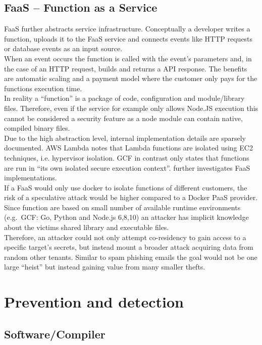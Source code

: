 \documentclass[conference,compsoc,final,a4paper]{IEEEtran}
\begin{document}
\subsection{\acs{FaaS} -- Function as a Service}
\acs{FaaS} further abstracts service infrastructure. Conceptually a developer writes a function, uploads it to the \acs{FaaS} service and connects events like HTTP requests or
database events as an input source. \\
When an event occurs the function is called with the event's parameters and, in the case of an HTTP request, builds and
returns a API response. The benefits are automatic scaling and a payment model where the customer only pays for the functions execution time. \cite{lambdaFeatures}\\
In reality a \enquote{function} is a package of code, configuration and module/library files. Therefore, even if the service for example only allows Node.JS execution
this cannot be considered a security feature as a node module can contain native, compiled binary files. \cite{lambdaFaq} \\
Due to the high abstraction level, internal implementation details are sparsely documented. \ac{AWS} Lambda notes that Lambda functions are isolated using EC2 techniques, i.e.
hypervisor isolation\cite{lambdaFaq}. \ac{GCF} in contrast only states that functions are run in
\enquote{its own isolated secure execution context}\cite{cloudFunc}. \textcite{wang2018peeking} further investigates \acs{FaaS} implementations. \\
If a \acs{FaaS} would only use docker to isolate functions of different customers, the risk of a speculative attack would be higher compared to a Docker \ac{PaaS} provider. Since function are based on small number of available runtime environments (e.g.\ \ac{GCF}: Go, Python and Node.js 6,8,10) \cite{cloudFunc} an attacker has implicit knowledge
about the victims shared library and executable files. \\
Therefore, an attacker could not only attempt co-residency to gain access to a specific target's secrets, but instead mount a broader attack acquiring data from random
other tenants. Similar to spam phishing emails the goal would not be one large \enquote{heist} but instead gaining value from many smaller thefts.
\section{Prevention and detection}
\subsection{Software/Compiler}
\end{document}
